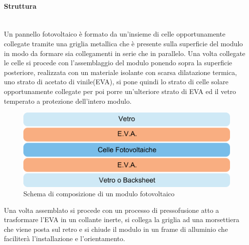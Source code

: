 \paragraph{Struttura}\mbox{}\\
Un pannello fotovoltaico è formato da un'insieme di celle opportunamente collegate tramite una griglia metallica che è presente sulla superficie del modulo in modo da formare sia collegamenti in serie che in parallelo. Una volta collegate le celle si procede con l'assemblaggio del modulo ponendo sopra la superficie posteriore, realizzata con un materiale isolante con scarsa dilatazione termica, uno strato di acetato di vinile(EVA), si pone quindi lo strato di celle solare opportunamente collegate per poi porre un'ulteriore strato di EVA ed il vetro temperato a protezione dell'intero modulo.\\
\begin{figure}[H]
    \centering
    \includegraphics[height=0.3\textwidth]{res/cap 3/composizione modulo}
    \caption{Schema di composizione di un modulo fotovoltaico}
\end{figure}\noindent
Una volta assemblato si procede con un processo di pressofusione atto a trasformare l'EVA in un collante inerte, si collega la griglia ad una morsettiera che viene posta sul retro e si chiude il modulo in un frame di alluminio che faciliterà l'installazione e l'orientamento.
